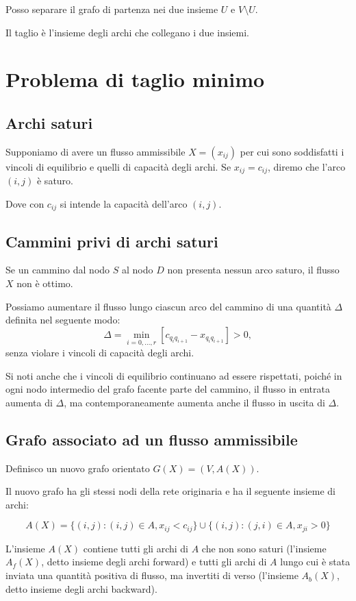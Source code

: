 Posso separare il grafo di partenza nei due insieme $U$ e $V \setminus U$.

Il taglio \`e l'insieme degli archi che collegano i due insiemi.

\section{Problema di taglio minimo}

\subsection{Archi saturi}
Supponiamo di avere un flusso ammissibile $X = (x_{ij})$ per cui sono soddisfatti i vincoli di equilibrio e quelli di capacità degli archi. Se $x_{ij} = c_{ij}$, diremo che l'arco $(i, j)$ è saturo.

Dove con $c_{ij}$ si intende la capacità dell'arco $(i, j)$.


\subsection{Cammini privi di archi saturi}
Se un cammino dal nodo $S$ al nodo $D$ non presenta nessun arco saturo, il flusso $X$ non è ottimo.

Possiamo aumentare il flusso lungo ciascun arco del cammino di una quantità $\Delta$ definita nel seguente modo:
\[
\Delta = \min_{i=0,...,r} \left[ c_{q_iq_{i+1}} - x_{q_iq_{i+1}} \right] > 0,
\]
senza violare i vincoli di capacità degli archi.

Si noti anche che i vincoli di equilibrio continuano ad essere rispettati, poiché in ogni nodo intermedio del grafo facente parte del cammino, il flusso in entrata aumenta di $\Delta$, ma contemporaneamente aumenta anche il flusso in uscita di $\Delta$.


\subsection{Grafo associato ad un flusso ammissibile}

Definisco un nuovo grafo orientato $G(X) = (V, A(X))$.

Il nuovo grafo ha gli stessi nodi della rete originaria e ha il seguente insieme di archi:

\[
A(X) = \{(i, j) : (i, j) \in A, x_{ij} < c_{ij}\} \cup \{(i, j) : (j, i) \in A, x_{ji} > 0\}
\]

L'insieme $A(X)$ contiene tutti gli archi di $A$ che non sono saturi (l'insieme $A_f(X)$, detto insieme degli archi forward) e tutti gli archi di $A$ lungo cui è stata inviata una quantità positiva di flusso, ma invertiti di verso (l'insieme $A_b(X)$, detto insieme degli archi backward).



